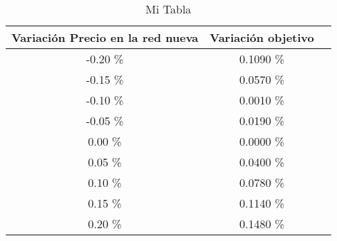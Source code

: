 \begin{table}
\centering
\begin{tabular}{|c|c|c|}
\hline
 Variación Precio en la red nueva & Variación objetivo \\ \hline
-0.20 \% & 0.1090 \% \\ \hline
-0.15 \% & 0.0570 \% \\ \hline
-0.10 \% & 0.0010 \% \\ \hline
-0.05 \% & 0.0190 \% \\ \hline
0.00 \% & 0.0000 \% \\ \hline
0.05 \% & 0.0400 \% \\ \hline
0.10 \% & 0.0780 \% \\ \hline
0.15 \% & 0.1140 \% \\ \hline
0.20 \% & 0.1480 \% \\ \hline
\end{tabular}
\caption{Mi Tabla}
\end{table}
